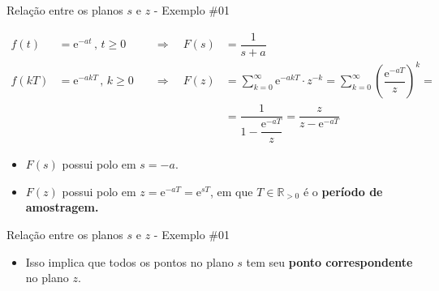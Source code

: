 \begin{frame}{Relação entre os planos $s$ e $z$ - Exemplo \#01}
\begin{block}{}
	\begin{align*}
		f(t)&=\text{e}^{-at}\, , \, t\geqslant 0& \quad \Rightarrow \quad F(s)&=\dfrac{1}{s+a}\\
		f(kT)&=\text{e}^{-akT}\, , \, k\geqslant 0& \quad \Rightarrow \quad F(z)&=\sum_{k=0}^{\infty} \text{e}^{-akT}\cdot z^{-k}=\sum_{k=0}^{\infty}\left( \dfrac{\text{e}^{-aT}}{z} \right)^{k}=\\
		& & &=\dfrac{1}{1-\dfrac{\text{e}^{-aT}}{z}}=\dfrac{z}{z-\text{e}^{-aT}}
	\end{align*}
	
	\begin{itemize}
		\item $ F(s) $ possui polo em $ s=-a $.
		\item $ F(z) $ possui polo em $ z=\text{e}^{-aT}=\text{e}^{sT} $, em que $ T\in \mathbb{R}_{>0} $ é o \textbf{período de amostragem.}
	\end{itemize}
\end{block}
\end{frame}


\begin{frame}{Relação entre os planos $s$ e $z$ - Exemplo \#01}
\begin{minipage}{0.45\linewidth}
	\centering
	
	\scalebox{0.45}{}
\end{minipage}
\hfill
\begin{minipage}{0.45\linewidth}
	\centering
	
	\scalebox{0.45}{}
\end{minipage}

\begin{block}{}
	\begin{itemize}
		\item Isso implica que todos os pontos no plano $ s $ tem seu \textbf{ponto correspondente} no plano $ z $.
	\end{itemize}
\end{block}

\end{frame}

